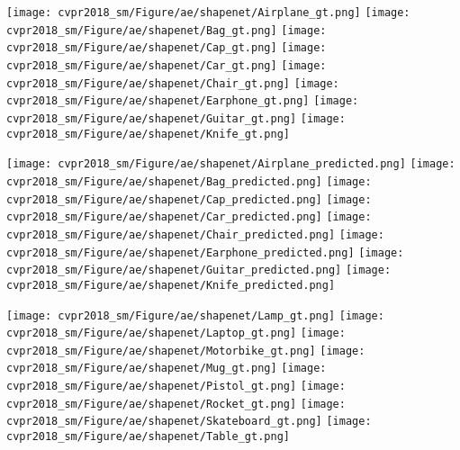 \documentclass[10pt,twocolumn,letterpaper]{article}
\begin{document}
\begin{figure*}[t] 
        \centering
        
        \texttt{[image: cvpr2018\_sm/Figure/ae/shapenet/Airplane\_gt.png]}
        \texttt{[image: cvpr2018\_sm/Figure/ae/shapenet/Bag\_gt.png]}
        \texttt{[image: cvpr2018\_sm/Figure/ae/shapenet/Cap\_gt.png]}
        \texttt{[image: cvpr2018\_sm/Figure/ae/shapenet/Car\_gt.png]}
        \texttt{[image: cvpr2018\_sm/Figure/ae/shapenet/Chair\_gt.png]}
        \texttt{[image: cvpr2018\_sm/Figure/ae/shapenet/Earphone\_gt.png]}
        \texttt{[image: cvpr2018\_sm/Figure/ae/shapenet/Guitar\_gt.png]}
        \texttt{[image: cvpr2018\_sm/Figure/ae/shapenet/Knife\_gt.png]}
        
        \texttt{[image: cvpr2018\_sm/Figure/ae/shapenet/Airplane\_predicted.png]}
        \texttt{[image: cvpr2018\_sm/Figure/ae/shapenet/Bag\_predicted.png]}
        \texttt{[image: cvpr2018\_sm/Figure/ae/shapenet/Cap\_predicted.png]}
        \texttt{[image: cvpr2018\_sm/Figure/ae/shapenet/Car\_predicted.png]}
        \texttt{[image: cvpr2018\_sm/Figure/ae/shapenet/Chair\_predicted.png]}
        \texttt{[image: cvpr2018\_sm/Figure/ae/shapenet/Earphone\_predicted.png]}
        \texttt{[image: cvpr2018\_sm/Figure/ae/shapenet/Guitar\_predicted.png]}
        \texttt{[image: cvpr2018\_sm/Figure/ae/shapenet/Knife\_predicted.png]}
        
        \texttt{[image: cvpr2018\_sm/Figure/ae/shapenet/Lamp\_gt.png]}
        \texttt{[image: cvpr2018\_sm/Figure/ae/shapenet/Laptop\_gt.png]}
        \texttt{[image: cvpr2018\_sm/Figure/ae/shapenet/Motorbike\_gt.png]}
        \texttt{[image: cvpr2018\_sm/Figure/ae/shapenet/Mug\_gt.png]}
        \texttt{[image: cvpr2018\_sm/Figure/ae/shapenet/Pistol\_gt.png]}
        \texttt{[image: cvpr2018\_sm/Figure/ae/shapenet/Rocket\_gt.png]}
        \texttt{[image: cvpr2018\_sm/Figure/ae/shapenet/Skateboard\_gt.png]}
        \texttt{[image: cvpr2018\_sm/Figure/ae/shapenet/Table\_gt.png]}
        

\end{figure*}
\end{document}
